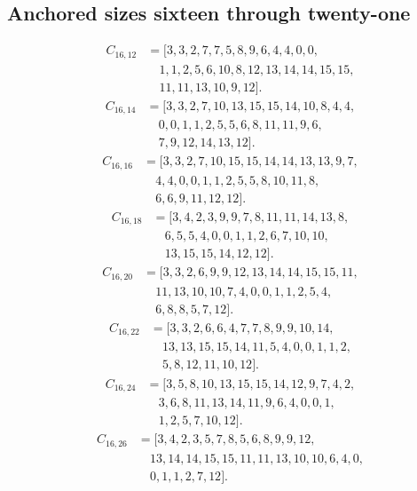 \documentclass[11pt,a4paper]{article}
\theoremstyle{definition}\newtheorem{definition}[theorem]{Definition}
\theoremstyle{remark}\newtheorem{remark}[theorem]{Remark}
\begin{document}
\subsection{Anchored sizes sixteen through twenty-one}
\[\begin{aligned}
C_{16,12}&=[3,3,2,7,7,5,8,9,6,4,4,0,0,\\
&\quad 1,1,2,5,6,10,8,12,13,14,14,15,15,\\
&\quad 11,11,13,10,9,12].
\end{aligned}\]
\[\begin{aligned}
C_{16,14}&=[3,3,2,7,10,13,15,15,14,10,8,4,4,\\
&\quad 0,0,1,1,2,5,5,6,8,11,11,9,6,\\
&\quad 7,9,12,14,13,12].
\end{aligned}\]
\[\begin{aligned}
C_{16,16}&=[3,3,2,7,10,15,15,14,14,13,13,9,7,\\
&\quad 4,4,0,0,1,1,2,5,5,8,10,11,8,\\
&\quad 6,6,9,11,12,12].
\end{aligned}\]
\[\begin{aligned}
C_{16,18}&=[3,4,2,3,9,9,7,8,11,11,14,13,8,\\
&\quad 6,5,5,4,0,0,1,1,2,6,7,10,10,\\
&\quad 13,15,15,14,12,12].
\end{aligned}\]
\[\begin{aligned}
C_{16,20}&=[3,3,2,6,9,9,12,13,14,14,15,15,11,\\
&\quad 11,13,10,10,7,4,0,0,1,1,2,5,4,\\
&\quad 6,8,8,5,7,12].
\end{aligned}\]
\[\begin{aligned}
C_{16,22}&=[3,3,2,6,6,4,7,7,8,9,9,10,14,\\
&\quad 13,13,15,15,14,11,5,4,0,0,1,1,2,\\
&\quad 5,8,12,11,10,12].
\end{aligned}\]
\[\begin{aligned}
C_{16,24}&=[3,5,8,10,13,15,15,14,12,9,7,4,2,\\
&\quad 3,6,8,11,13,14,11,9,6,4,0,0,1,\\
&\quad 1,2,5,7,10,12].
\end{aligned}\]
\[\begin{aligned}
C_{16,26}&=[3,4,2,3,5,7,8,5,6,8,9,9,12,\\
&\quad 13,14,14,15,15,11,11,13,10,10,6,4,0,\\
&\quad 0,1,1,2,7,12].
\end{aligned}\]
\end{document}
